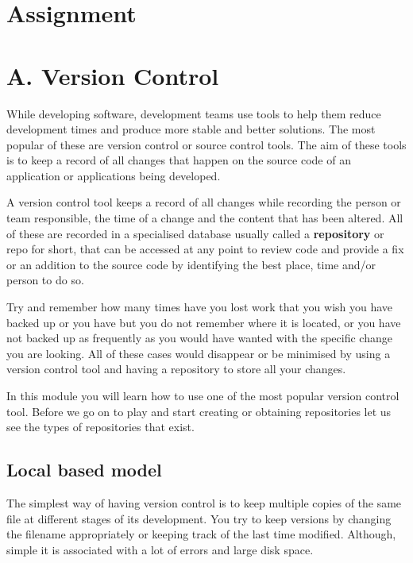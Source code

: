 \documentclass[
]{book}
\begin{document}
\hypertarget{assignment}{%
\section*{Assignment}\label{assignment}}

\hypertarget{a.-version-control}{%
\section*{A. Version Control}\label{a.-version-control}}

While developing software, development teams use tools to help them reduce development times and produce more stable and better solutions.
The most popular of these are version control or source control tools. The aim of these tools is to keep a record of all changes that happen on the source code of an application or applications being developed.

A version control tool keeps a record of all changes while recording the person or team responsible, the time of a change and the content that has been altered. All of these are recorded in a specialised database usually called a \textbf{repository} or repo for short, that can be accessed at any point to review code and provide a fix or an addition to the source code by identifying the best place, time and/or person to do so.

Try and remember how many times have you lost work that you wish you have backed up or you have but you do not remember where it is located, or you have not backed up as frequently as you would have wanted with the specific change you are looking. All of these cases would disappear or be minimised by using a version control tool and having a repository to store all your changes.

In this module you will learn how to use one of the most popular version control tool. Before we go on to play and start creating or obtaining repositories let us see the types of repositories that exist.

\hypertarget{local-based-model}{%
\subsection*{Local based model}\label{local-based-model}}

The simplest way of having version control is to keep multiple copies of the same file at different stages of its development. You try to keep versions by changing the filename appropriately or keeping track of the last time modified. Although, simple it is associated with a lot of errors and large disk space.
\end{document}
